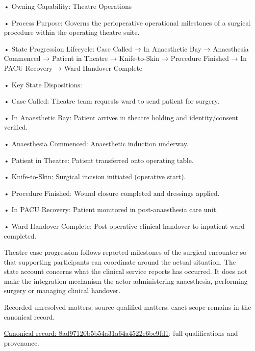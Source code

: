 •
Owning Capability: Theatre Operations



•
Process Purpose: Governs the perioperative operational milestones of a surgical procedure within the operating theatre suite.



•
State Progression Lifecycle: Case Called → In Anaesthetic Bay → Anaesthesia Commenced → Patient in Theatre → Knife-to-Skin → Procedure Finished → In PACU Recovery → Ward Handover Complete



•
Key State Dispositions:



•
Case Called: Theatre team requests ward to send patient for surgery.



•
In Anaesthetic Bay: Patient arrives in theatre holding and identity/consent verified.



•
Anaesthesia Commenced: Anaesthetic induction underway.



•
Patient in Theatre: Patient transferred onto operating table.



•
Knife-to-Skin: Surgical incision initiated (operative start).



•
Procedure Finished: Wound closure completed and dressings applied.



•
In PACU Recovery: Patient monitored in post-anaesthesia care unit.



•
Ward Handover Complete: Post-operative clinical handover to inpatient ward completed.



Theatre case progression follows reported milestones of the surgical encounter so that supporting participants can coordinate around the actual situation. The state account concerns what the clinical service reports has occurred. It does not make the integration mechanism the actor administering anaesthesia, performing surgery or managing clinical handover.


{\small Recorded unresolved matters: source-qualified matters; exact scope remains in the canonical record.}\par
{\footnotesize \href{../../../../continuum/business/business-process/8ad97120b5b54a31a64a4522e6bc9fd1.md}{Canonical record: 8ad97120b5b54a31a64a4522e6bc9fd1}; full qualifications and provenance.}\par

